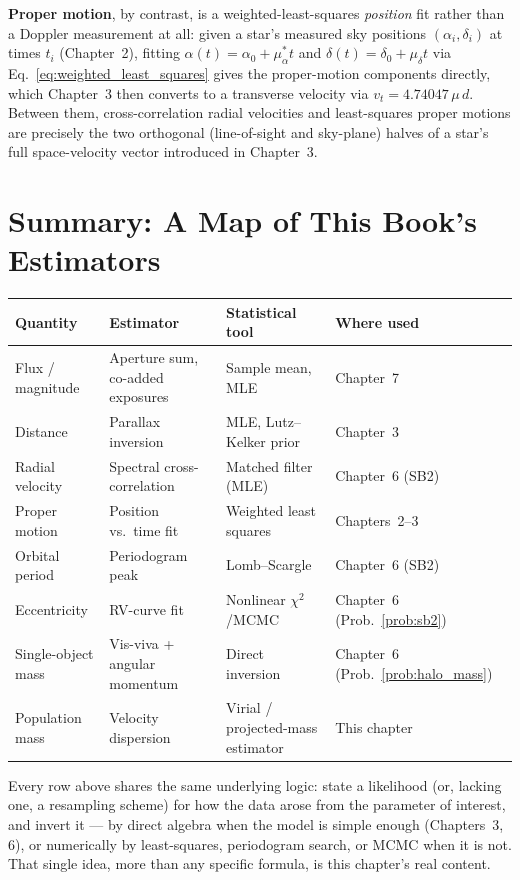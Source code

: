 \textbf{Proper motion}, by contrast, is a weighted-least-squares \emph{position} fit rather than a Doppler measurement at all: given a star's measured sky positions $(\alpha_i,\delta_i)$ at times $t_i$ (Chapter~2), fitting $\alpha(t)=\alpha_0+\mu_\alpha^* t$ and $\delta(t)=\delta_0+\mu_\delta t$ via Eq.~\eqref{eq:weighted_least_squares} gives the proper-motion components directly, which Chapter~3 then converts to a transverse velocity via $v_t=4.74047\,\mu\,d$. Between them, cross-correlation radial velocities and least-squares proper motions are precisely the two orthogonal (line-of-sight and sky-plane) halves of a star's full space-velocity vector introduced in Chapter~3.

\section{Summary: A Map of This Book's Estimators}

\begin{center}
	\begin{tabular}{@{}p{3.1cm}p{4.3cm}p{3.0cm}p{3.4cm}@{}}
		\toprule
		\textbf{Quantity} & \textbf{Estimator} & \textbf{Statistical tool} & \textbf{Where used} \\
		\midrule
		Flux / magnitude & Aperture sum, co-added exposures & Sample mean, MLE & Chapter~7 \\
		Distance & Parallax inversion & MLE, Lutz--Kelker prior & Chapter~3 \\
		Radial velocity & Spectral cross-correlation & Matched filter (MLE) & Chapter~6 (SB2) \\
		Proper motion & Position vs.\ time fit & Weighted least squares & Chapters~2--3 \\
		Orbital period & Periodogram peak & Lomb--Scargle & Chapter~6 (SB2) \\
		Eccentricity & RV-curve fit & Nonlinear $\chi^2$/MCMC & Chapter~6 (Prob.~\ref{prob:sb2}) \\
		Single-object mass & Vis-viva + angular momentum & Direct inversion & Chapter~6 (Prob.~\ref{prob:halo_mass}) \\
		Population mass & Velocity dispersion & Virial / projected-mass estimator & This chapter \\
		\bottomrule
	\end{tabular}
\end{center}

Every row above shares the same underlying logic: state a likelihood (or, lacking one, a resampling scheme) for how the data arose from the parameter of interest, and invert it --- by direct algebra when the model is simple enough (Chapters~3, 6), or numerically by least-squares, periodogram search, or MCMC when it is not. That single idea, more than any specific formula, is this chapter's real content.
